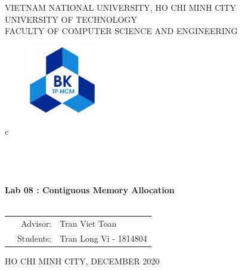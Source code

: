 \documentclass[13pt,a4paper]{article}
\begin{document}
	
	\begin{titlepage}
		\begin{center}
			VIETNAM NATIONAL UNIVERSITY, HO CHI MINH CITY \\
			UNIVERSITY OF TECHNOLOGY \\
			FACULTY OF COMPUTER SCIENCE AND ENGINEERING
		\end{center}
		
		\vspace{1cm}
		
		\begin{figure}[h!]
			\begin{center}
				\includegraphics[width=3cm]{hcmut.png}
			\end{center}
		\end{figure}
		
		\vspace{1cm}
		
		\begin{center}
			\color{blue}
			\begin{tabular}{c}
				\\
				~~\\
				\hline
				\\
				\\
				\\
				\textbf{{\huge Lab 08 : Contiguous Memory Allocation}}\\
				\\
				\hline
			\end{tabular}
			\color{blue}
		\end{center}
		\vspace{1cm}
		
		\begin{table}[h]
			\color{blue}
			\begin{tabular}{rrl}
				\hspace{5 cm} & Advisor: & Tran Viet Toan\\
				& Students: & Tran Long Vi - 1814804 \\
			\end{tabular}
			\color{blue}
		\end{table}
		
		\vspace{4 cm}
		\begin{center}
			{\footnotesize\large HO CHI MINH CITY, DECEMBER 2020}
		\end{center}
	\end{titlepage}
	
\end{document}
